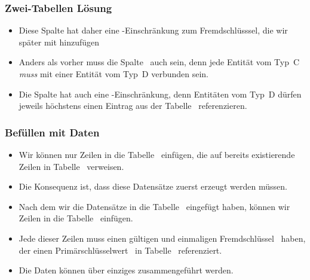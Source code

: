 \begin{frame}%
\frametitle{Zwei-Tabellen Lösung}%
\parbox{0.435\linewidth}{\small%
\begin{itemize}%
%
%
%
%
%
%
%
%
%
\item<5-> Diese Spalte hat daher eine -Einschränkung zum Fremdschlüsssel, die wir später mit  hinzufügen%
%
\item<6-> \alert{Anders} als vorher muss die Spalte~ auch  sein, denn jede Entität vom Typ~C \emph{muss} mit einer Entität vom Typ~D verbunden sein.%
%
\item<7-> Die Spalte hat auch eine -Einschränkung, denn Entitäten vom Typ~D dürfen jeweils höchstens einen Eintrag aus der Tabelle~ referenzieren.%
%
\end{itemize}%
}%
%
\end{frame}%
%
\begin{frame}[t]%
\frametitle{Befüllen mit Daten}%
\parbox{0.435\linewidth}{\small%
\begin{itemize}%
\item Wir können nur Zeilen in die Tabelle~ einfügen, die auf bereits existierende Zeilen in Tabelle~ verweisen.
%
\item<2-> Die Konsequenz ist, dass diese Datensätze zuerst erzeugt werden müssen.%
%
\item<3-> Nach dem wir die Datensätze in die Tabelle~ eingefügt haben, können wir Zeilen in die Tabelle~ einfügen.%
%
\item<4-> Jede dieser Zeilen muss einen gültigen und einmaligen Fremdschlüssel~ haben, der einen Primärschlüsselwert~ in Tabelle~ referenziert.%
%
\item<5-> Die Daten können über einziges  zusammengeführt werden.
\end{itemize}%
}%
%
\end{frame}%
